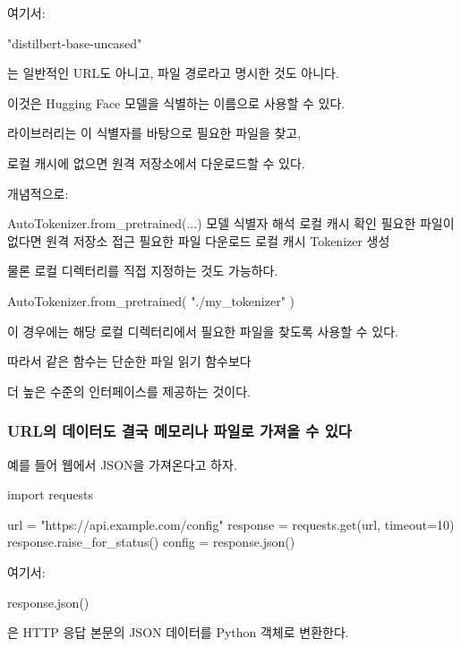 여기서:

\begin{dhkzsh}
"distilbert-base-uncased"
\end{dhkzsh}

는 일반적인 URL도 아니고, 파일 경로라고 명시한 것도 아니다.

이것은 Hugging Face 모델을 식별하는 이름으로 사용할 수 있다.

라이브러리는 이 식별자를 바탕으로 필요한 파일을 찾고,

로컬 캐시에 없으면 원격 저장소에서 다운로드할 수 있다.

개념적으로:

\begin{dhksmry}[centered]
AutoTokenizer.from_pretrained(...)
\da
모델 식별자 해석
\da
로컬 캐시 확인
\da
필요한 파일이 없다면
\da
원격 저장소 접근
\da
필요한 파일 다운로드
\da
로컬 캐시
\da
Tokenizer 생성
\end{dhksmry}

물론 로컬 디렉터리를 직접 지정하는 것도 가능하다.

\begin{dhkcode}
AutoTokenizer.from_pretrained(
    "./my_tokenizer"
)
\end{dhkcode}

이 경우에는 해당 로컬 디렉터리에서 필요한 파일을 찾도록 사용할 수 있다.

따라서 같은 함수는 단순한 파일 읽기 함수보다

더 높은 수준의 인터페이스를 제공하는 것이다.

\subsubsection{URL의 데이터도 결국 메모리나 파일로 가져올 수 있다}

예를 들어 웹에서 JSON을 가져온다고 하자.

\begin{dhkcode}
import requests

url = "https://api.example.com/config"
response = requests.get(url, timeout=10)
response.raise_for_status()
config = response.json()
\end{dhkcode}

여기서:

\begin{dhkcode}
response.json()
\end{dhkcode}

은 HTTP 응답 본문의 JSON 데이터를 Python 객체로 변환한다.

